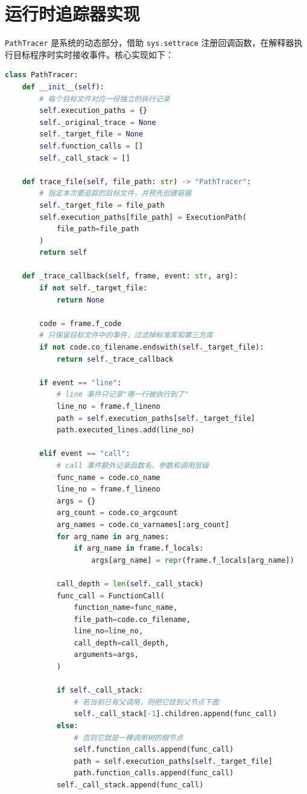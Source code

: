 \section{运行时追踪器实现}

\texttt{PathTracer} 是系统的动态部分，借助 \texttt{sys.settrace} 注册回调函数，在解释器执行目标程序时实时接收事件。核心实现如下：

\begin{lstlisting}[language=Python, caption={运行时追踪器的核心回调逻辑}]
class PathTracer:
    def __init__(self):
        # 每个目标文件对应一份独立的执行记录
        self.execution_paths = {}
        self._original_trace = None
        self._target_file = None
        self.function_calls = []
        self._call_stack = []

    def trace_file(self, file_path: str) -> "PathTracer":
        # 指定本次要追踪的目标文件，并预先创建容器
        self._target_file = file_path
        self.execution_paths[file_path] = ExecutionPath(
            file_path=file_path
        )
        return self

    def _trace_callback(self, frame, event: str, arg):
        if not self._target_file:
            return None

        code = frame.f_code
        # 只保留目标文件中的事件，过滤掉标准库和第三方库
        if not code.co_filename.endswith(self._target_file):
            return self._trace_callback

        if event == "line":
            # line 事件只记录"哪一行被执行到了"
            line_no = frame.f_lineno
            path = self.execution_paths[self._target_file]
            path.executed_lines.add(line_no)

        elif event == "call":
            # call 事件额外记录函数名、参数和调用层级
            func_name = code.co_name
            line_no = frame.f_lineno
            args = {}
            arg_count = code.co_argcount
            arg_names = code.co_varnames[:arg_count]
            for arg_name in arg_names:
                if arg_name in frame.f_locals:
                    args[arg_name] = repr(frame.f_locals[arg_name])

            call_depth = len(self._call_stack)
            func_call = FunctionCall(
                function_name=func_name,
                file_path=code.co_filename,
                line_no=line_no,
                call_depth=call_depth,
                arguments=args,
            )

            if self._call_stack:
                # 若当前已有父调用，则把它挂到父节点下面
                self._call_stack[-1].children.append(func_call)
            else:
                # 否则它就是一棵调用树的根节点
                self.function_calls.append(func_call)
                path = self.execution_paths[self._target_file]
                path.function_calls.append(func_call)
            self._call_stack.append(func_call)


\end{lstlisting}
